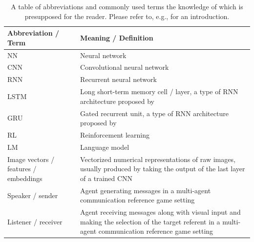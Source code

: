 \begin{table}[]
	\centering
	\begin{tabularx}{\textwidth}{|X|X|}
		\hline
		\textbf{Abbreviation / Term} & \textbf{Meaning / Definition}                                                                                                                          \\ \hline
		NN                           & Neural network                                                                                                                                         \\ \hline
		CNN                          & Convolutional neural network                                                                                                                           \\ \hline
		RNN                          & Recurrent neural network                                                                                                                               \\ \hline
		LSTM                         & Long short-term memory cell / layer, a type of RNN architecture proposed by \cite{hochreiter1997long}                                                                                                                         \\ \hline
		GRU                   & Gated recurrent unit, a type of RNN architecture proposed by \cite{cho2014properties}                            \\ \hline
		RL                           & Reinforcement learning                                                                                                                                 \\ \hline
		LM 						& Language model \parencite{jurafsky2000speech} \\ \hline
		Image vectors / features / embeddings & Vectorized numerical representations of raw images, usually produced by taking the output of the last layer of a trained CNN \\ \hline
		Speaker / sender             & Agent generating messages in a multi-agent communication reference game setting                                                                        \\ \hline
		Listener / receiver          & Agent receiving messages along with visual input and making the selection of the target referent in a multi-agent communication reference game setting \\ \hline
		
	\end{tabularx}
\caption{\label{tab:defs}A table of abbreviations and commonly used terms the knowledge of which is presupposed for the reader. Please refer to, e.g., \cite{goodfellow2016deep} for an introduction.}

\end{table}


